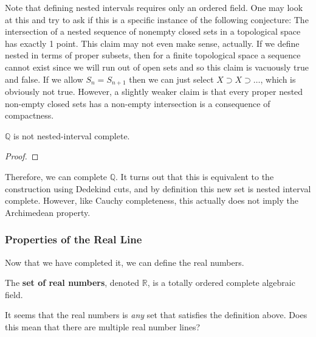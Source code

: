 \documentclass{article}
\begin{document}
      Note that defining nested intervals requires only an ordered field. One may look at this and try to ask if this is a specific instance of the following conjecture: The intersection of a nested sequence of nonempty closed sets in a topological space has exactly 1 point. This claim may not even make sense, actually. If we define nested in terms of proper subsets, then for a finite topological space a sequence cannot exist since we will run out of open sets and so this claim is vacuously true and false. If we allow $S_n = S_{n+1}$ then we can just select $X \supset X \supset \ldots$, which is obviously not true. However, a slightly weaker claim is that every proper nested non-empty closed sets has a non-empty intersection is a consequence of compactness. 

      \begin{theorem}
        $\mathbb{Q}$ is not nested-interval complete. 
      \end{theorem}
      \begin{proof}
      \end{proof}

      Therefore, we can complete $\mathbb{Q}$. It turns out that this is equivalent to the construction using Dedekind cuts, and by definition this new set is nested interval complete. However, like Cauchy completeness, this actually does not imply the Archimedean property. 

    \subsubsection{Properties of the Real Line} 

      Now that we have completed it, we can define the real numbers. 

      \begin{definition}
        The \textbf{set of real numbers}, denoted $\mathbb{R}$, is a totally ordered complete algebraic field. 
      \end{definition} 

      It seems that the real numbers is \textit{any} set that satisfies the definition above. Does this mean that there are multiple real number lines? 
\end{document}
